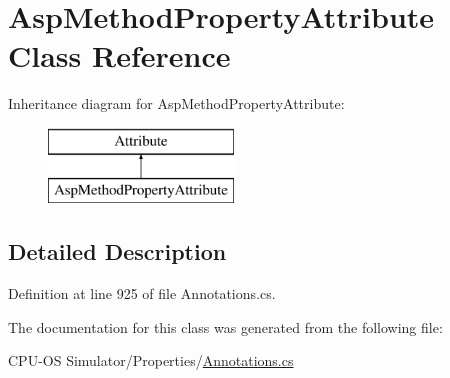 \hypertarget{class_asp_method_property_attribute}{}\section{Asp\+Method\+Property\+Attribute Class Reference}
\label{class_asp_method_property_attribute}
Inheritance diagram for Asp\+Method\+Property\+Attribute\+:\begin{figure}[H]
\begin{center}
\leavevmode
\includegraphics[height=2.000000cm]{class_asp_method_property_attribute}
\end{center}
\end{figure}


\subsection{Detailed Description}


Definition at line 925 of file Annotations.\+cs.



The documentation for this class was generated from the following file\+:\begin{DoxyCompactItemize}
\item 
C\+P\+U-\/\+O\+S Simulator/\+Properties/\hyperlink{_annotations_8cs}{Annotations.\+cs}\end{DoxyCompactItemize}
